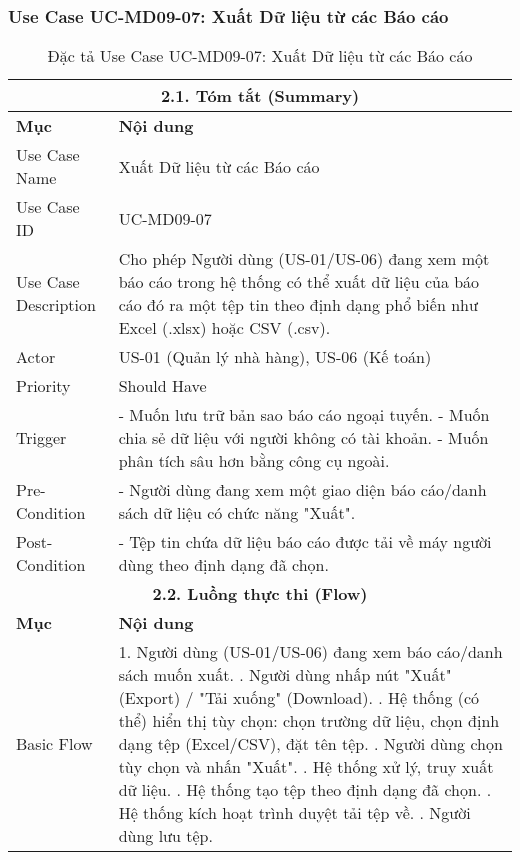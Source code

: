 \subsubsection{Use Case UC-MD09-07: Xuất Dữ liệu từ các Báo cáo}
\begin{longtable}{|m{4cm}|p{11cm}|}
\caption{Đặc tả Use Case UC-MD09-07: Xuất Dữ liệu từ các Báo cáo} \label{tab:uc_md09_07_corrected} \\
\hline
\multicolumn{2}{|c|}{\textbf{2.1. Tóm tắt (Summary)}} \\
\hline
\textbf{Mục} & \textbf{Nội dung} \\
\hline
\endhead %
\midrule
\endfoot %
\bottomrule
\endlastfoot %
Use Case Name & Xuất Dữ liệu từ các Báo cáo \\
\hline
Use Case ID & UC-MD09-07 \\
\hline
Use Case Description & Cho phép Người dùng (US-01/US-06) đang xem một báo cáo trong hệ thống có thể xuất dữ liệu của báo cáo đó ra một tệp tin theo định dạng phổ biến như Excel (.xlsx) hoặc CSV (.csv). \\
\hline
Actor & US-01 (Quản lý nhà hàng), US-06 (Kế toán) \\
\hline
Priority & Should Have \\
\hline
Trigger & - Muốn lưu trữ bản sao báo cáo ngoại tuyến. \newline - Muốn chia sẻ dữ liệu với người không có tài khoản. \newline - Muốn phân tích sâu hơn bằng công cụ ngoài. \\
\hline
Pre-Condition & - Người dùng đang xem một giao diện báo cáo/danh sách dữ liệu có chức năng "Xuất". \\
\hline
Post-Condition & - Tệp tin chứa dữ liệu báo cáo được tải về máy người dùng theo định dạng đã chọn. \\
\hline
\multicolumn{2}{|c|}{\textbf{2.2. Luồng thực thi (Flow)}} \\
\hline
\textbf{Mục} & \textbf{Nội dung} \\
\hline
Basic Flow & 1. Người dùng (US-01/US-06) đang xem báo cáo/danh sách muốn xuất. \newline 2. Người dùng nhấp nút "Xuất" (Export) / "Tải xuống" (Download). \newline 3. Hệ thống (có thể) hiển thị tùy chọn: chọn trường dữ liệu, chọn định dạng tệp (Excel/CSV), đặt tên tệp. \newline 4. Người dùng chọn tùy chọn và nhấn "Xuất". \newline 5. Hệ thống xử lý, truy xuất dữ liệu. \newline 6. Hệ thống tạo tệp theo định dạng đã chọn. \newline 7. Hệ thống kích hoạt trình duyệt tải tệp về. \newline 8. Người dùng lưu tệp. \\

\end{longtable}
